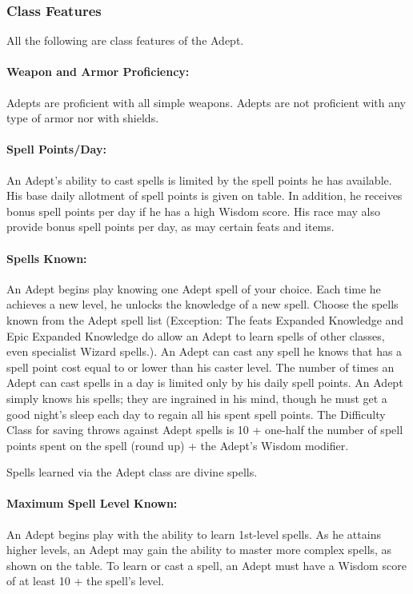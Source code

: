 \subsubsection{Class Features}
All the following are class features of the Adept.

\paragraph{Weapon and Armor Proficiency:} 
Adepts are proficient with all simple weapons. Adepts are not proficient with any type of armor nor with shields.

\paragraph{Spell Points/Day:} An Adept's ability to cast spells is limited by the spell points he has available. 
His base daily allotment of spell points is given on  table. 
In addition, he receives bonus spell points per day if he has a high Wisdom score.
His race may also provide bonus spell points per day, as may certain feats and items.

\paragraph{Spells Known:} An Adept begins play knowing one Adept spell of your choice. 
Each time he achieves a new level, he unlocks the knowledge of a new spell.
Choose the spells known from the Adept spell list (Exception: The feats Expanded Knowledge and Epic Expanded Knowledge do allow an Adept to learn spells of other classes, even specialist Wizard spells.).
An Adept can cast any spell he knows that has a spell point cost equal to or lower than his caster level.
The number of times an Adept can cast spells in a day is limited only by his daily spell points. 
An Adept simply knows his spells; they are ingrained in his mind, though he must get a good night's sleep each day to regain all his spent spell points.
The Difficulty Class for saving throws against Adept spells is 10 + one-half the number of spell points spent on the spell (round up) + the Adept's Wisdom modifier. 

Spells learned via the Adept class are divine spells.
\paragraph{Maximum Spell Level Known:} An Adept begins play with the ability to learn 1st-level spells. 
As he attains higher levels, an Adept may gain the ability to master more complex spells, as shown on the  table.
To learn or cast a spell, an Adept must have a Wisdom score of at least 10 + the spell's level.

